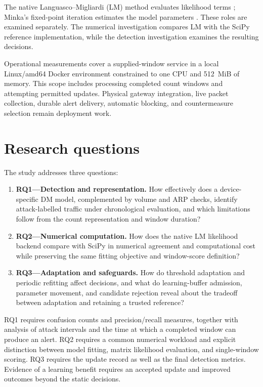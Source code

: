 The native Languasco--Migliardi (LM) method evaluates likelihood terms
\cite{languasco2023}; Minka's fixed-point iteration estimates the model
parameters \cite{minka2000}. These roles are examined separately. The
numerical investigation compares LM with the SciPy reference
implementation, while the detection investigation examines the resulting
decisions.

Operational measurements cover a supplied-window service in a local
Linux/amd64 Docker environment constrained to one CPU and 512~MiB of
memory. This scope includes processing completed count windows and
attempting permitted updates. Physical gateway integration, live packet
collection, durable alert delivery, automatic blocking, and countermeasure
selection remain deployment work.

\section{Research questions}

The study addresses three questions:
\begin{enumerate}
  \item \textbf{RQ1---Detection and representation.} How effectively does a
  device-specific DM model, complemented by volume and ARP checks, identify
  attack-labelled traffic under chronological evaluation, and which
  limitations follow from the count representation and window duration?
  \item \textbf{RQ2---Numerical computation.} How does the native LM
  likelihood backend compare with SciPy in numerical agreement and
  computational cost while preserving the same fitting objective and
  window-score definition?
  \item \textbf{RQ3---Adaptation and safeguards.} How do threshold adaptation
  and periodic refitting affect decisions, and what do learning-buffer
  admission, parameter movement, and candidate rejection reveal about the
  tradeoff between adaptation and retaining a trusted reference?
\end{enumerate}

RQ1 requires confusion counts and precision/recall measures, together with
analysis of attack intervals and the time at which a completed window can
produce an alert. RQ2 requires a common numerical workload and explicit
distinction between model fitting, matrix likelihood evaluation, and
single-window scoring. RQ3 requires the update record as well as the final
detection metrics. Evidence of a learning benefit requires an accepted
update and improved outcomes beyond the static decisions.

